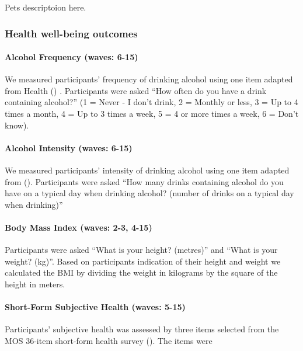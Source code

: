 \documentclass[
  singlecolumn,
  9pt]{article}
\let\oldparagraph\paragraph
\renewcommand{\paragraph}[1]{\oldparagraph{#1}\mbox{}}
\begin{document}
Pets descriptoion here.

\subsubsection{Health well-being
outcomes}\label{health-well-being-outcomes}

\paragraph{Alcohol Frequency (waves:
6-15)}\label{alcohol-frequency-waves-6-15}

We measured participants' frequency of drinking alcohol using one item
adapted from Health () .
Participants were asked ``How often do you have a drink containing
alcohol?'' (1 = Never - I don't drink, 2 = Monthly or less, 3 = Up to 4
times a month, 4 = Up to 3 times a week, 5 = 4 or more times a week, 6 =
Don't know).

\paragraph{Alcohol Intensity (waves:
6-15)}\label{alcohol-intensity-waves-6-15}

We measured participants' intensity of drinking alcohol using one item
adapted from ().
Participants were asked ``How many drinks containing alcohol do you have
on a typical day when drinking alcohol? (number of drinks on a typical
day when drinking)''

\paragraph{Body Mass Index (waves: 2-3,
4-15)}\label{body-mass-index-waves-2-3-4-15}

Participants were asked ``What is your height? (metres)'' and ``What is
your weight? (kg)''. Based on participants indication of their height
and weight we calculated the BMI by dividing the weight in kilograms by
the square of the height in meters.

\paragraph{Short-Form Subjective Health (waves:
5-15)}\label{short-form-subjective-health-waves-5-15}

Participants' subjective health was assessed by three items selected
from the MOS 36-item short-form health survey
(). The items were
\end{document}
